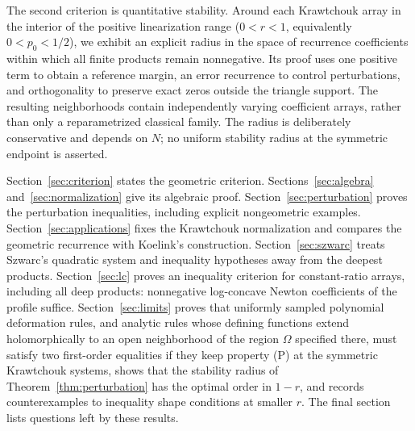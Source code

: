 \documentclass[twoside,10pt]{article}
\numberwithin{equation}{section}
\theoremstyle{slbody}
\theoremstyle{definition}
\theoremstyle{remark}
\begin{document}
The second criterion is quantitative stability. Around each Krawtchouk array in the interior of the positive linearization range ($0<r<1$, equivalently $0<p_0<1/2$), we exhibit an explicit radius in the space of recurrence coefficients within which all finite products remain nonnegative. Its proof uses one positive term to obtain a reference margin, an error recurrence to control perturbations, and orthogonality to preserve exact zeros outside the triangle support. The resulting neighborhoods contain independently varying coefficient arrays, rather than only a reparametrized classical family. The radius is deliberately conservative and depends on $N$; no uniform stability radius at the symmetric endpoint is asserted.

Section~\ref{sec:criterion} states the geometric criterion. Sections~\ref{sec:algebra} and~\ref{sec:normalization} give its algebraic proof. Section~\ref{sec:perturbation} proves the perturbation inequalities, including explicit nongeometric examples. Section~\ref{sec:applications} fixes the Krawtchouk normalization and compares the geometric recurrence with Koelink's construction. Section~\ref{sec:szwarc} treats Szwarc's quadratic system and inequality hypotheses away from the deepest products. Section~\ref{sec:lc} proves an inequality criterion for constant-ratio arrays, including all deep products: nonnegative log-concave Newton coefficients of the profile suffice. Section~\ref{sec:limits} proves that uniformly sampled polynomial deformation rules, and analytic rules whose defining functions extend holomorphically to an open neighborhood of the region $\Omega$ specified there, must satisfy two first-order equalities if they keep property (P) at the symmetric Krawtchouk systems, shows that the stability radius of Theorem~\ref{thm:perturbation} has the optimal order in $1-r$, and records counterexamples to inequality shape conditions at smaller $r$. The final section lists questions left by these results.
\end{document}
